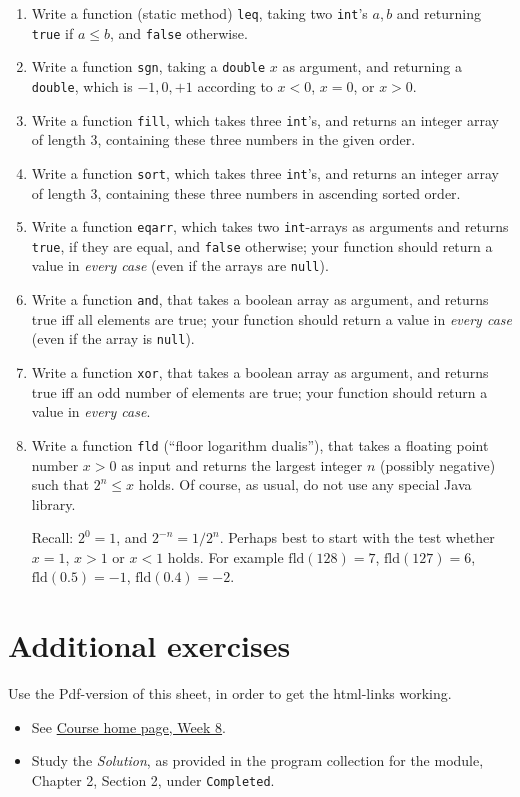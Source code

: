 \documentclass[11pt]{article}
\begin{document}
\begin{enumerate}
\item Write a function (static method) \texttt{leq}, taking two \texttt{int}'s $a, b$ and returning \texttt{true} if $a \le b$, and \texttt{false} otherwise.
\item Write a function \texttt{sgn}, taking a \texttt{double} $x$ as argument, and returning a \texttt{double}, which is $-1, 0 , +1$ according to $x < 0$, $x = 0$, or $x > 0$.
\item Write a function \texttt{fill}, which takes three \texttt{int}'s, and returns an integer array of length $3$, containing these three numbers in the given order.
\item Write a function \texttt{sort}, which takes three \texttt{int}'s, and returns an integer array of length $3$, containing these three numbers in ascending sorted order.
\item Write a function \texttt{eqarr}, which takes two \texttt{int}-arrays as arguments and returns \texttt{true}, if they are equal, and \texttt{false} otherwise; your function should return a value in \emph{every case} (even if the arrays are \texttt{null}).
\item Write a function \texttt{and}, that takes a boolean array as argument, and returns true iff all elements are true; your function should return a value in \emph{every case} (even if the array is \texttt{null}).
\item Write a function \texttt{xor}, that takes a boolean array as argument, and returns true iff an odd number of elements are true; your function should return a value in \emph{every case}.
\item Write a function \texttt{fld} (``floor logarithm dualis''), that takes a floating point number $x > 0$ as input and returns the largest integer $n$ (possibly negative) such that $2^n \le x$ holds. Of course, as usual, do not use any special Java library.

  Recall: $2^0 = 1$, and $2^{-n} = 1 / 2^n$. Perhaps best to start with the test whether $x = 1$, $x > 1$ or $x < 1$ holds. For example $\mathrm{fld}(128) = 7$, $\mathrm{fld}(127) = 6$, $\mathrm{fld}(0.5) = -1$, $\mathrm{fld}(0.4) = -2$.
\end{enumerate}


\section{Additional exercises}
\label{sec:addex}

Use the Pdf-version of this sheet, in order to get the html-links working.
\begin{itemize}
\item See \href{\chp#ExercisesWeek08}{Course home page, Week 8}.
\item Study the \emph{Solution}, as provided in the program collection for the module, Chapter 2, Section 2, under \texttt{Completed}.
\end{itemize}
\end{document}
